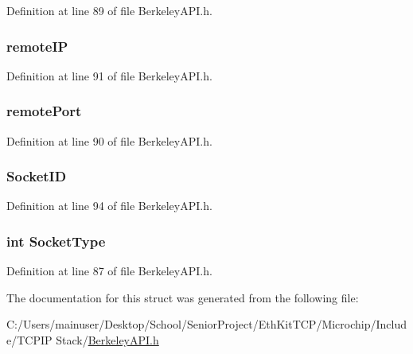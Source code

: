 Definition at line 89 of file Berkeley\+A\+P\+I.\+h.

\hypertarget{struct_b_s_d_socket_aa14bd86282eb60a34be94fe28c516f6d}{}
\subsubsection[{remote\+I\+P}]{ remote\+I\+P}\label{struct_b_s_d_socket_aa14bd86282eb60a34be94fe28c516f6d}


Definition at line 91 of file Berkeley\+A\+P\+I.\+h.

\hypertarget{struct_b_s_d_socket_a2ec385f33979be71fe355f5ea5f1f609}{}
\subsubsection[{remote\+Port}]{ remote\+Port}\label{struct_b_s_d_socket_a2ec385f33979be71fe355f5ea5f1f609}


Definition at line 90 of file Berkeley\+A\+P\+I.\+h.

\hypertarget{struct_b_s_d_socket_a6302c1f4ef1d35ec801d349cfbaa21c9}{}
\subsubsection[{Socket\+I\+D}]{ Socket\+I\+D}\label{struct_b_s_d_socket_a6302c1f4ef1d35ec801d349cfbaa21c9}


Definition at line 94 of file Berkeley\+A\+P\+I.\+h.

\hypertarget{struct_b_s_d_socket_a80dfcccad4190214f0ca2f4b6c351a84}{}
\subsubsection[{Socket\+Type}]{\setlength{\rightskip}{0pt plus 5cm}int Socket\+Type}\label{struct_b_s_d_socket_a80dfcccad4190214f0ca2f4b6c351a84}


Definition at line 87 of file Berkeley\+A\+P\+I.\+h.



The documentation for this struct was generated from the following file\+:\begin{DoxyCompactItemize}
\item 
C\+:/\+Users/mainuser/\+Desktop/\+School/\+Senior\+Project/\+Eth\+Kit\+T\+C\+P/\+Microchip/\+Include/\+T\+C\+P\+I\+P Stack/\hyperlink{_berkeley_a_p_i_8h}{Berkeley\+A\+P\+I.\+h}\end{DoxyCompactItemize}
